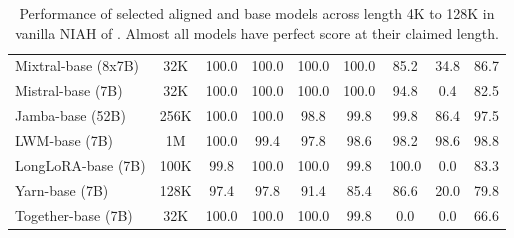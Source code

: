 \begin{table}[h]
{\begin{tabular}{@{}l|c|cccccc|c@{}}
\midrule
\midrule

Mixtral-base (8x7B) & 32K & 100.0 & 100.0 & 100.0 & 100.0 & 85.2 & 34.8 & 86.7 \\
Mistral-base (7B) & 32K & 100.0 & 100.0 & 100.0 & 100.0 & 94.8 & 0.4 & 82.5 \\
Jamba-base (52B) & 256K & 100.0 & 100.0 & 98.8 & 99.8 & 99.8 & 86.4 & 97.5 \\
LWM-base (7B) & 1M & 100.0 & 99.4 & 97.8 & 98.6 & 98.2 & 98.6 & 98.8 \\
LongLoRA-base (7B) & 100K & 99.8 & 100.0 & 100.0 & 99.8 & 100.0 & 0.0 & 83.3 \\
Yarn-base (7B) & 128K & 97.4 & 97.8 & 91.4 & 85.4 & 86.6 & 20.0 & 79.8 \\
Together-base (7B) & 32K & 100.0 & 100.0 & 100.0 & 99.8 & 0.0 & 0.0 & 66.6 \\

\bottomrule
\end{tabular}}
\caption{Performance of selected aligned and base models across length 4K to 128K in vanilla NIAH of . Almost all models have perfect score at their claimed length.}
\label{tab:main_result_passkey_2}
\end{table}